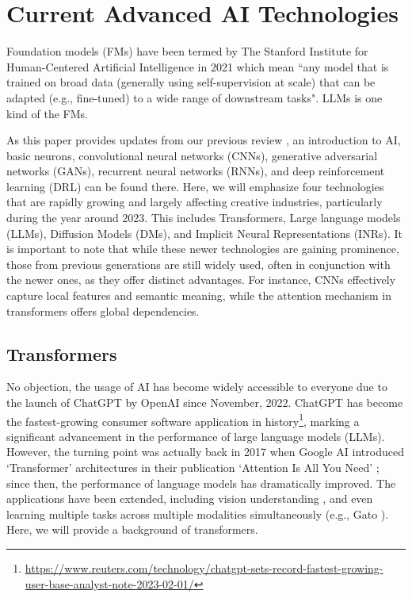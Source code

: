 \documentclass[11pt,a4paper]{article}
\begin{document}
\section{Current Advanced AI Technologies}
\label{sec:overview}

Foundation models (FMs) have been termed by The Stanford Institute for Human-Centered Artificial Intelligence in 2021 \cite{Bommasani2021FoundationModels} which mean ``any model that is trained on broad data (generally using self-supervision at scale) that can be adapted (e.g., fine-tuned) to a wide range of downstream tasks". LLMs is one kind of the FMs.

As this paper provides updates from our previous review \cite{Anantrasirichai:AI:2022}, an introduction to AI, basic neurons, convolutional neural networks (CNNs), generative adversarial networks (GANs), recurrent neural networks (RNNs), and deep reinforcement learning (DRL) can be found there. Here, we will emphasize four technologies that are rapidly growing and largely affecting creative industries, particularly during the year around 2023. This includes Transformers, Large language models (LLMs), Diffusion Models (DMs), and Implicit Neural Representations (INRs). It is important to note that while these newer technologies are gaining prominence, those from previous generations are still widely used, often in conjunction with the newer ones, as they offer distinct advantages. For instance, CNNs effectively capture local features and semantic meaning, while the attention mechanism in transformers offers global dependencies.

\subsection{Transformers}
\label{ssec:transformers}

No objection, the usage of AI has become widely accessible to everyone due to the launch of ChatGPT by OpenAI since November, 2022. ChatGPT has become the fastest-growing consumer software application in history\footnote{\url{https://www.reuters.com/technology/chatgpt-sets-record-fastest-growing-user-base-analyst-note-2023-02-01/}}, marking a significant advancement in the performance of large language models (LLMs). However, the turning point was actually back in 2017 when Google AI introduced `Transformer' architectures in their publication `Attention Is All You Need' \cite{Vaswani:attention:2017}; since then, the performance of language models has dramatically improved.  The applications have been extended, including vision understanding \cite{Dosovitskiy:image:2021}, and even learning multiple tasks across multiple modalities simultaneously (e.g., Gato \cite{Reed:Generalist:2022}). Here, we will provide a background of transformers. 
\end{document}
